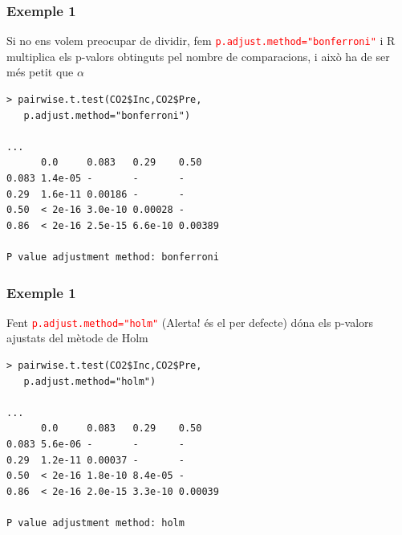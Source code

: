 \documentclass[12pt,t]{beamer}
\newcommand{\red}[1]{\textcolor{red}{#1}}
\theoremstyle{plain}
\theoremstyle{definition}
\begin{document}
\begin{frame}[fragile]
\frametitle{Exemple 1}

Si no ens volem preocupar de dividir, fem \red{\texttt{p.adjust.method="bonferroni"}} i R multiplica els p-valors obtinguts pel nombre de comparacions, i això ha de ser més petit que $\alpha$
{\small \begin{verbatim}
> pairwise.t.test(CO2$Inc,CO2$Pre,
   p.adjust.method="bonferroni")

...
      0.0     0.083   0.29    0.50   
0.083 1.4e-05 -       -       -      
0.29  1.6e-11 0.00186 -       -      
0.50  < 2e-16 3.0e-10 0.00028 -      
0.86  < 2e-16 2.5e-15 6.6e-10 0.00389

P value adjustment method: bonferroni 
\end{verbatim}
}


\end{frame}


\begin{frame}[fragile]
\frametitle{Exemple 1}

Fent \red{\texttt{p.adjust.method="holm"}} (Alerta! és el per defecte) dóna els p-valors ajustats del mètode de Holm

{\small \begin{verbatim}
> pairwise.t.test(CO2$Inc,CO2$Pre,
   p.adjust.method="holm")

...
      0.0     0.083   0.29    0.50   
0.083 5.6e-06 -       -       -      
0.29  1.2e-11 0.00037 -       -      
0.50  < 2e-16 1.8e-10 8.4e-05 -      
0.86  < 2e-16 2.0e-15 3.3e-10 0.00039

P value adjustment method: holm 
\end{verbatim}
}


\end{frame}
\end{document}
